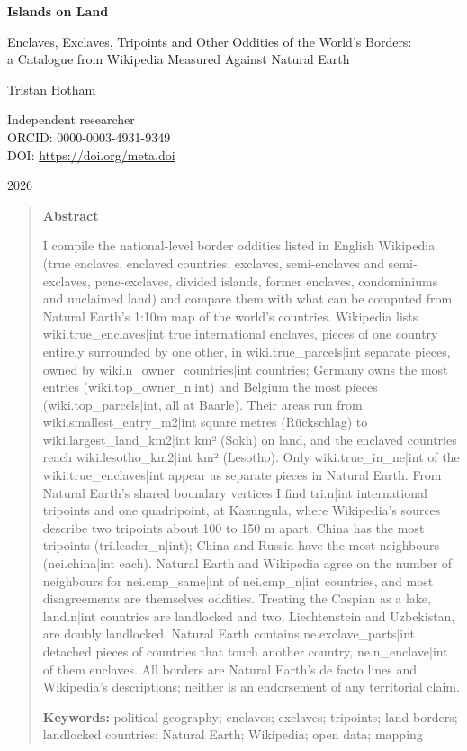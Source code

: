 \documentclass[11pt,a4paper]{article}
\begin{document}
\begin{center}
{\Large\bfseries Islands on Land\par}
\vspace{0.4em}
{\large Enclaves, Exclaves, Tripoints and Other Oddities of the World's Borders:\\a Catalogue from Wikipedia Measured Against Natural Earth\par}
\vspace{1.2em}
{\large Tristan Hotham\par}
\vspace{0.3em}
{\small Independent researcher\\
ORCID: 0000-0003-4931-9349\\
DOI: \href{https://doi.org/{{meta.doi}}}{https://doi.org/{{meta.doi}}}\par}
\vspace{0.8em}
2026
\end{center}

\begin{quote}
\small
\begin{center}\textbf{Abstract}\end{center}
I compile the national-level border oddities listed in English Wikipedia (true enclaves, enclaved countries, exclaves, semi-enclaves and semi-exclaves, pene-exclaves, divided islands, former enclaves, condominiums and unclaimed land) and compare them with what can be computed from Natural Earth's 1:10m map of the world's countries. Wikipedia lists {{wiki.true_enclaves|int}} true international enclaves, pieces of one country entirely surrounded by one other, in {{wiki.true_parcels|int}} separate pieces, owned by {{wiki.n_owner_countries|int}} countries; Germany owns the most entries ({{wiki.top_owner_n|int}}) and Belgium the most pieces ({{wiki.top_parcels|int}}, all at Baarle). Their areas run from {{wiki.smallest_entry_m2|int}} square metres (Rückschlag) to {{wiki.largest_land_km2|int}} km² (Sokh) on land, and the enclaved countries reach {{wiki.lesotho_km2|int}} km² (Lesotho). Only {{wiki.true_in_ne|int}} of the {{wiki.true_enclaves|int}} appear as separate pieces in Natural Earth. From Natural Earth's shared boundary vertices I find {{tri.n|int}} international tripoints and one quadripoint, at Kazungula, where Wikipedia's sources describe two tripoints about 100 to 150 m apart. China has the most tripoints ({{tri.leader_n|int}}); China and Russia have the most neighbours ({{nei.china|int}} each). Natural Earth and Wikipedia agree on the number of neighbours for {{nei.cmp_same|int}} of {{nei.cmp_n|int}} countries, and most disagreements are themselves oddities. Treating the Caspian as a lake, {{land.n|int}} countries are landlocked and two, Liechtenstein and Uzbekistan, are doubly landlocked. Natural Earth contains {{ne.exclave_parts|int}} detached pieces of countries that touch another country, {{ne.n_enclave|int}} of them enclaves. All borders are Natural Earth's de facto lines and Wikipedia's descriptions; neither is an endorsement of any territorial claim.

\textbf{Keywords:} political geography; enclaves; exclaves; tripoints; land borders; landlocked countries; Natural Earth; Wikipedia; open data; mapping
\end{quote}
\end{document}
